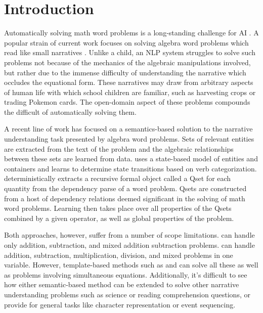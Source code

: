 \section{Introduction}
Automatically solving math word problems is a long-standing challenge for AI \cite{bobrow1964natural,charniak1969computer,seo2015solving,shi2015automatically}.
A popular strain of current work focuses on solving algebra word problems which read like small narratives \cite{Roy15,roy2015solving,hosseini2014learning,kushman2014learning,koncel2015parsing,zhou2015learn}.
Unlike a child, an NLP system struggles to solve such problems not because of the mechanics of the algebraic manipulations involved, but rather due to the immense difficulty of understanding the narrative which occludes the equational form. 
These narratives may draw from arbitrary aspects of human life with which school children are familiar, such as harvesting crops or trading Pokemon cards. The open-domain aspect of these problems compounds the difficult of automatically solving them.

A recent line of work has focused on a semantics-based solution to the narrative understanding task presented by algebra word problems. Sets of relevant entities are extracted from the text of the problem and the algebraic relationships between these sets are learned from data. 
 uses a state-based model of entities and containers and learns to determine state transitions based on verb categorization. 
 deterministically extracts a recursive formal object called a Qset for each quantity from the dependency parse of a word problem. 
Qsets are constructed from a host of dependency relations deemed significant in the solving of math word problems. Learning then takes place over all properties of the Qsets combined by a given operator, as well as global properties of the problem.

Both approaches, however, suffer from a number of scope limitations. 
 can handle only addition, subtraction, and mixed addition subtraction problems. 
 can handle addition, subtraction, multiplication, division, and mixed problems in one variable. 
However, template-based methods such as  and  can solve all these as well as problems involving simultaneous equations. Additionally, it’s difficult to see how either semantic-based method can be extended to solve other narrative understanding problems such as science or reading comprehension questions, or provide for general tasks like character representation or event sequencing.

